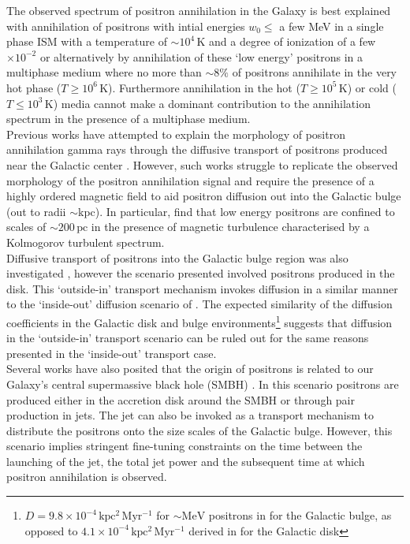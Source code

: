 \documentclass[a4paper,fleqn,usenatbib]{mnras}
\begin{document}
 The observed spectrum of positron annihilation in the Galaxy is best explained with annihilation of positrons with intial energies $w_0\leq$ a few MeV in a single phase ISM with a temperature of $\sim 10^4\,\mathrm{K}$ and a degree of ionization of a few $\times 10^{-2}$ \citep{Churazov05, Siegert16} or alternatively by annihilation of these `low energy' positrons in a multiphase medium where no more than $\sim8\%$ of positrons annihilate in the very hot phase ($T\geq10^6\,\mathrm{K}$). Furthermore annihilation in the hot ($T\geq10^5\,\mathrm{K}$) or cold ($T\leq10^3\,\mathrm{K}$) media cannot make a dominant contribution to the annihilation spectrum \citep{Churazov05, Siegert16} in the presence of a multiphase medium.\\
Previous works have attempted to explain the morphology of positron annihilation gamma rays through the diffusive transport of positrons \citep{Martin2012, Alexis14} produced near the Galactic center \citep[refered to herein as `inside-out' transport, e.g. ][]{Jean09}. However, such works struggle to replicate the observed morphology of the positron annihilation signal and require the presence of a highly ordered magnetic field to aid positron diffusion out into the Galactic bulge (out to radii $\sim$kpc). In particular, \cite{Jean09} find that low energy positrons are confined to scales of $\sim200\,\mathrm{pc}$ in the presence of magnetic turbulence characterised by a Kolmogorov turbulent spectrum.\\
Diffusive transport of positrons into the Galactic bulge region was also investigated \citep{Prantzos06, Higdon09, Martin2012, Alexis14}, however the scenario presented involved positrons produced in the disk. This `outside-in' transport mechanism invokes diffusion in a similar manner to the `inside-out' diffusion scenario of \cite{Jean09}. The expected similarity of the diffusion coefficients in the Galactic disk and bulge environments\footnote{$D = 9.8 \times 10^{-4}\,\mathrm{kpc^2\,Myr^{-1}}$ for $\sim\mathrm{MeV}$ positrons in \cite{Jean09} for the Galactic bulge, as opposed to  $4.1 \times 10^{-4} \,\mathrm{kpc^2\, Myr^{-1}}$ derived in \cite{Maurin01} for the Galactic disk} suggests that diffusion in the `outside-in' transport scenario can be ruled out for the same reasons presented in the `inside-out' transport case.\\
Several works have also posited that the origin of positrons is related to our Galaxy's central supermassive black hole (SMBH) \citep[e.g.][]{Totani06, Cheng06}. In this scenario positrons are produced either in the accretion disk around the SMBH or through pair production in jets. The jet can also be invoked as a transport mechanism to distribute the positrons onto the size scales of the Galactic bulge. However, this scenario implies stringent fine-tuning constraints on the time between the launching of the jet, the total jet power and the subsequent time at which positron annihilation is observed.\\
\end{document}
